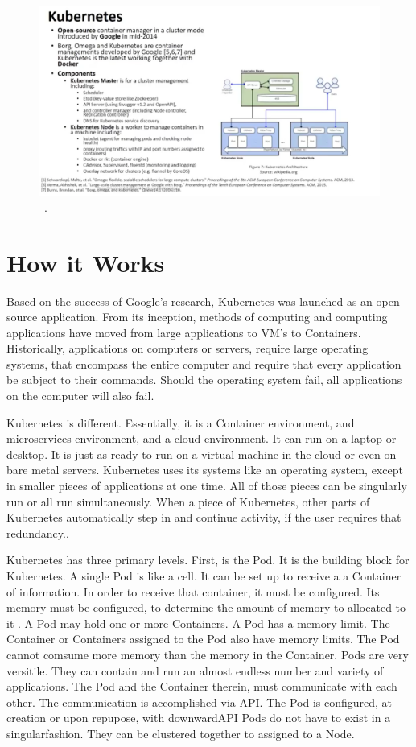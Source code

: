 \begin{figure}[!ht]
\centering\includegraphics[width=\columnwidth]{images/kubernetes.png }~\cite{definition}.
\end{figure}

\section{How it Works}

 
Based on the success of Google's research, Kubernetes was launched as
an open source application.  From its inception, methods of computing 
and computing applications have moved from large applications to VM's
to Containers.  Historically, applications on computers or servers, require
large operating systems, that encompass the entire computer and
require that every application be subject to their commands.  Should
the operating system fail, all applications on the computer will also
fail.   

Kubernetes is different.  Essentially, it is a Container environment,
and microservices environment, and a cloud environment.  It can run on
a laptop or desktop.  It is just as ready to run on a virtual machine
in the cloud or even on bare metal servers.  Kubernetes uses its
systems like an operating system, except in smaller pieces of
applications at one time.  All of those pieces can be singularly run
or all run simultaneously.  When a piece of Kubernetes, other parts of
Kubernetes automatically step in and continue activity, if the user
requires that redundancy.\cite{concept}.

Kubernetes has three primary levels.  First, is the Pod.  It is the
building block for Kubernetes.  A single Pod is like a cell.  It can
be set up to receive a a Container of information.  In order to
receive that container, it must be configured.  Its memory must be
configured, to determine the amount of memory to allocated to it
\cite{pods}.  A Pod may hold one or more Containers.  A Pod has a
memory limit.  The Container or Containers assigned to the Pod also
have memory limits.  The Pod cannot comsume more memory than the
memory in the Container.  Pods are very versitile.  They can contain
and run an almost endless number and variety of applications.  The Pod
and the Container therein, must communicate with each other.  The
communication is accomplished via API.  The Pod is configured, at
creation or upon repupose, with downwardAPI Pods do not have to exist
in a singularfashion.  They can be clustered together to assigned to a Node.  

